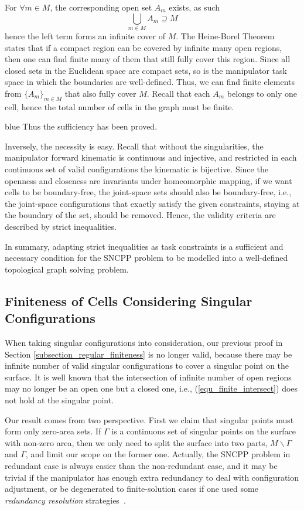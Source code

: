 \documentclass[Afour,sageh,times]{sagej}
\begin{document}
For $\forall m\in M$, the corresponding open set $A_m$ exists, as such %
\begin{equation}
\bigcup\limits_{m\in M}A_m\supseteq M
\end{equation}
hence the left term forms an infinite cover of $M$. 
The Heine-Borel Theorem~\cite{Simmons1964Introduction} states that if a compact region can be covered by infinite many open regions, then one can find finite many of them that still fully cover this region. Since all closed sets in the Euclidean space are compact sets, so is the manipulator 
task space in which the boundaries are well-defined. Thus, we can find finite elements from $\{A_m\}_{m\in M}$ that also fully 
cover $M$. Recall that each $A_m$ belongs to only one cell, hence the total number of cells in the graph must be finite. 
\begin{color}{blue}
Thus the sufficiency has been proved.

Inversely, the necessity is easy. Recall that without the singularities, the manipulator forward kinematic is continuous and injective, and restricted in each continuous set of valid configurations the kinematic is bijective. 
Since the openness and closeness are invariants under homeomorphic mapping, if we want cells to be boundary-free, the joint-space sets should also be boundary-free, i.e., the joint-space configurations that exactly satisfy the given constraints, staying at the boundary of the set, should be removed. Hence, the validity criteria are described by strict inequalities. 

In summary, adapting strict inequalities as task constraints is a sufficient and necessary condition for the SNCPP problem to be modelled into a well-defined topological graph solving problem. 

\subsection{Finiteness of Cells Considering Singular Configurations}\label{subsection_all_finiteness}
When taking singular configurations into consideration, our previous proof in Section \ref{subsection_regular_finiteness} is no longer valid, because there may be infinite number of valid singular configurations to cover a singular point on the surface. 
It is well known that the intersection of infinite number of open regions may no longer be an open one but a closed one, i.e., (\ref{equ_finite_intersect}) does not hold at the singular point. 

Our result comes from two perspective. 
First we claim that singular points must form only zero-area sets. If $\Gamma$ is a continuous set of singular points on the surface with non-zero area, then we only need to split the surface into two parts, $M\backslash \Gamma$ and $\Gamma$, and limit our scope on the former one. Actually, the SNCPP problem in redundant case is always easier than the non-redundant case, and it may be trivial if the manipulator has enough extra redundancy to deal with configuration adjustment, or be degenerated to finite-solution cases if one used some \textit{redundancy resolution} strategies~\cite{Hauser2018Global}.  


\end{color}
\end{document}
